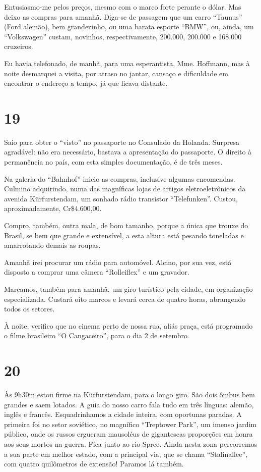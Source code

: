 Entusiasmo-me pelos preços, mesmo com o marco forte perante o dólar. Mas deixo as compras para amanhã. Diga-se de passagem que um carro ``Taunus'' (Ford alemão), bem grandezinho, ou uma barata esporte ``BMW'', ou, ainda, um ``Volkswagen'' custam, novinhos, respectivamente, 200.000, 200.000 e 168.000 cruzeiros.

Eu havia telefonado, de manhã, para uma esperantista, Mme. Hoffmann, mas à noite desmarquei a visita, por atraso no jantar, cansaço e dificuldade em encontrar o endereço a tempo, já que ficava distante.

\section*{19 \adfflatleafright {}}
Saio para obter o ``visto'' no passaporte no Consulado da Holanda. Surpresa agradável: não era necessário, bastava a apresentação do passaporte. O direito à permanência no país, com esta simples documentação, é de três meses.

Na galeria do ``Bahnhof'' inicio as compras, inclusive algumas encomendas. Culmino adquirindo, numa das magníficas lojas de artigos eletroeletrônicos da avenida Kürfurstendam, um sonhado rádio transistor ``Telefunken''. Custou, aproximadamente, Cr\$4.600,00.

Compro, também, outra mala, de bom tamanho, porque a única que trouxe do Brasil, se bem que grande e extensível, a esta altura está pesando toneladas e amarrotando demais as roupas.

Amanhã irei procurar um rádio para automóvel. Alcino, por sua vez, está disposto a comprar uma câmera ``Rolleiflex'' e um gravador.

Marcamos, também para amanhã, um giro turístico pela cidade, em organização especializada. Custará oito marcos e levará cerca de quatro horas, abrangendo todos os setores.

À noite, verifico que no cinema perto de nossa rua, aliás praça, está programado o filme brasileiro ``O Cangaceiro'', para o dia 2 de setembro.

\section*{20 \adfflatleafright {}}
Às 9h30m estou firme na Kürfurstendam, para o longo giro. São dois ônibus bem grandes e saem lotados. A guia do nosso carro fala tudo em três línguas: alemão, inglês e francês. Esquadrinhamos a cidade inteira, com oportunas paradas. A primeira foi no setor soviético, no magnífico ``Treptower Park'', um imenso jardim público, onde os russos ergueram mausoléus de gigantescas proporções em honra aos seus mortos na guerra. Fica junto ao rio Spree. Ainda nesta zona percorremos a sua parte em melhor estado, com a principal via, que se chama ``Stalinallee'', com quatro quilômetros de extensão! Paramos lá também.

